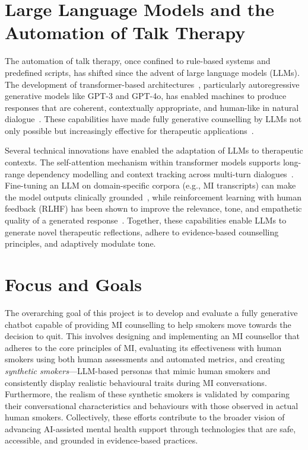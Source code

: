 \section{Large Language Models and the Automation of Talk Therapy}
The automation of talk therapy, once confined to rule-based systems and predefined scripts, has shifted since the advent of large language models (LLMs). The development of transformer-based architectures~\cite{vaswani2017attention}, particularly autoregressive generative models like GPT-3 and GPT-4o, has enabled machines to produce responses that are coherent, contextually appropriate, and human-like in natural dialogue~\cite{openai2023gpt4}. These capabilities have made fully generative counselling by LLMs not only possible but increasingly effective for therapeutic applications~\cite{miner2020artificial, LEE2021856}.

Several technical innovations have enabled the adaptation of LLMs to therapeutic contexts. The self-attention mechanism within transformer models supports long-range dependency modelling and context tracking across multi-turn dialogues~\cite{vaswani2017attention}. Fine-tuning an LLM on domain-specific corpora (e.g., MI transcripts) can make the model outputs clinically grounded~\cite{kong2025llmtherapistssalespeopleevaluating}, while reinforcement learning with human feedback (RLHF) has been shown to improve the relevance, tone, and empathetic quality of a generated response~\cite{10.5555/3600270.3602281}. Together, these capabilities enable LLMs to generate novel therapeutic reflections, adhere to evidence-based counselling principles, and adaptively modulate tone.



\section{Focus and Goals}
The overarching goal of this project is to develop and evaluate a fully generative chatbot capable of providing MI counselling to help smokers move towards the decision to quit. This involves designing and implementing an MI counsellor that adheres to the core principles of MI, evaluating its effectiveness with human smokers using both human assessments and automated metrics, and creating \emph{synthetic smokers}---LLM-based personas that mimic human smokers and consistently display realistic behavioural traits during MI conversations. Furthermore, the realism of these synthetic smokers is validated by comparing their conversational characteristics and behaviours with those observed in actual human smokers. Collectively, these efforts contribute to the broader vision of advancing AI-assisted mental health support through technologies that are safe, accessible, and grounded in evidence-based practices.

